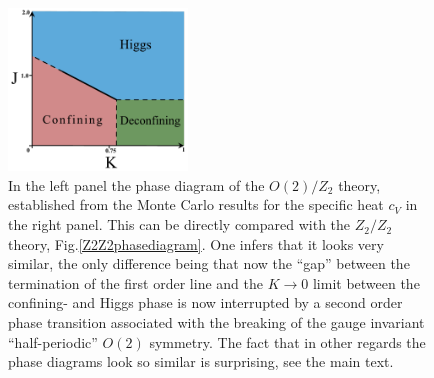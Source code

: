 \begin{figure}[!h]
	\centering	\includegraphics[width=0.425\textwidth]{figures/chapter2/O2Z2phasedia.pdf}
	\caption{In the left panel the phase diagram of the $O(2)/Z_2$ theory, established from the Monte Carlo results for the specific heat $c_V$ in the right panel. This can be directly compared with the $Z_2/Z_2$ theory, Fig.\ref{Z2Z2phasediagram}. One infers that it looks very similar, the only difference being that now the ``gap'' between the termination of the first order line and the $K \rightarrow 0$ limit between the confining- and Higgs phase is now interrupted by a second order phase transition associated with the breaking of the gauge invariant ``half-periodic'' $O(2)$ symmetry. The fact that in other regards the phase diagrams look so similar is surprising, see the main text. } 
	\label{O2Z2phasediagram}
\end{figure}



